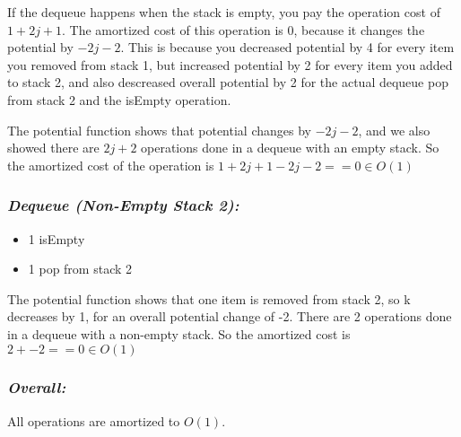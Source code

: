 If the dequeue happens when the stack is empty, you pay the operation cost of $1 + 2j + 1$. The amortized cost of this operation is $0$, because it changes the potential by $-2j - 2$. This is because you decreased potential by 4 for every item you removed from stack 1, but increased potential by 2 for every item you added to stack 2, and also descreased overall potential by 2 for the actual dequeue pop from stack 2 and the isEmpty operation.

The potential function shows that potential changes by $-2j - 2$, and we also showed there are $2j + 2$ operations done in a dequeue with an empty stack. So the amortized cost of the operation is $1 + 2j + 1 - 2j - 2 == 0 \in O(1)$

\subsubsection*{\em Dequeue (Non-Empty Stack 2):}
\begin{itemize}
\item 1 isEmpty 
\item 1 pop from stack 2
\end{itemize}

The potential function shows that one item is removed from stack 2, so k decreases by 1, for an overall potential change of -2. There are 2 operations done in a dequeue with a non-empty stack. So the amortized cost is $2 + -2 == 0 \in O(1)$

\subsubsection*{\em Overall:}
All operations are amortized to $O(1)$.
